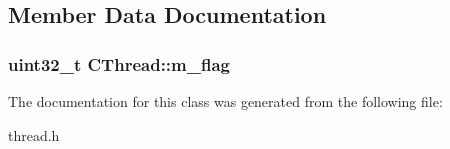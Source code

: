 \subsection{Member Data Documentation}
\hypertarget{class_c_thread_a2723c18f3f7659cdd93610fd1654d564}{
\subsubsection[{m\-\_\-flag}]{\setlength{\rightskip}{0pt plus 5cm}uint32\-\_\-t C\-Thread\-::m\-\_\-flag\hspace{0.3cm}{\ttfamily [protected]}}}\label{class_c_thread_a2723c18f3f7659cdd93610fd1654d564}


The documentation for this class was generated from the following file\-:\begin{DoxyCompactItemize}
\item 
thread.\-h\end{DoxyCompactItemize}
